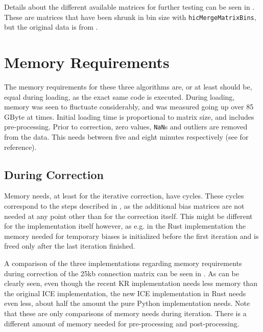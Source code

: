 
Details about the different available matrices for further testing can be seen
in . These are matrices that have been shrunk in bin size
with \verb|hicMergeMatrixBins|, but the original data is from \cite{rao20143d}.







\section{Memory Requirements}\label{sec:memory}

The memory requirements for these three algorithms are, or at least should be,
equal during loading, as the exact same code is executed. During loading,
memory was seen to fluctuate considerably, and was measured going up over 85
GByte at times. Initial loading time is proportional to matrix size, and
includes pre-processing. Prior to correction, zero values, \verb|NaN|s and
outliers are removed from the data. This needs between five and eight minutes
respectively (see  for reference).


\newpage
\subsection{During Correction}\label{sec:itermem}

Memory needs, at least for the iterative correction, have cycles. These cycles
correspond to the steps described in , as the additional bias
matrices are not needed at any point other than for the correction itself. This
might be different for the implementation itself however, as e.g. in the Rust
implementation the memory needed for temporary biases is initialized before the
first iteration and is freed only after the last iteration finished.

A comparison of the three implementations regarding memory requirements during
correction of the 25kb connection matrix can be seen in .
As can be clearly seen, even though the recent KR implementation needs less
memory than the original ICE implementation, the new ICE implementation in Rust
needs even less, about half the amount the pure Python implementation needs.
Note that these are only comparisons of memory needs during iteration. There is
a different amount of memory needed for pre-processing and post-processing.

